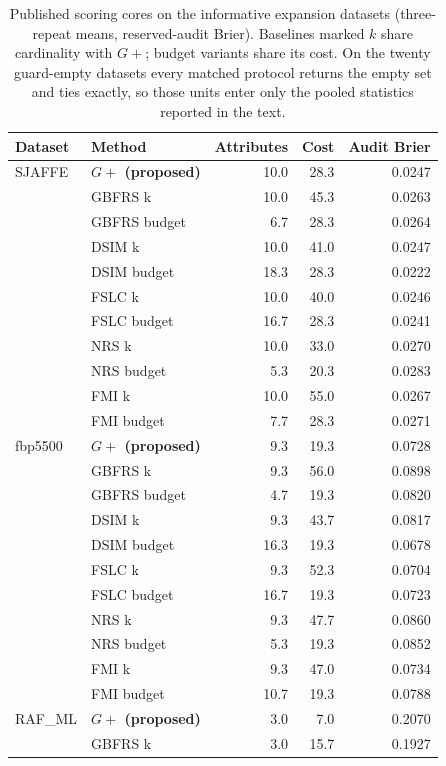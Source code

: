 \begin{table}[htbp]
\centering\small\renewcommand{\arraystretch}{1.25}\setlength{\tabcolsep}{4pt}
\caption{Published scoring cores on the informative expansion datasets (three-repeat means, reserved-audit Brier). Baselines marked $k$ share cardinality with $G+$; budget variants share its cost. On the twenty guard-empty datasets every matched protocol returns the empty set and ties exactly, so those units enter only the pooled statistics reported in the text.}
\label{tab:expansion-published}
\begin{tabular}{llrrr}\hline
Dataset & Method & Attributes & Cost & Audit Brier\\\hline
SJAFFE & \textbf{$G+$ (proposed)} & 10.0 & 28.3 & 0.0247\\
 & GBFRS k & 10.0 & 45.3 & 0.0263\\
 & GBFRS budget & 6.7 & 28.3 & 0.0264\\
 & DSIM k & 10.0 & 41.0 & 0.0247\\
 & DSIM budget & 18.3 & 28.3 & 0.0222\\
 & FSLC k & 10.0 & 40.0 & 0.0246\\
 & FSLC budget & 16.7 & 28.3 & 0.0241\\
 & NRS k & 10.0 & 33.0 & 0.0270\\
 & NRS budget & 5.3 & 20.3 & 0.0283\\
 & FMI k & 10.0 & 55.0 & 0.0267\\
 & FMI budget & 7.7 & 28.3 & 0.0271\\
\hline
fbp5500 & \textbf{$G+$ (proposed)} & 9.3 & 19.3 & 0.0728\\
 & GBFRS k & 9.3 & 56.0 & 0.0898\\
 & GBFRS budget & 4.7 & 19.3 & 0.0820\\
 & DSIM k & 9.3 & 43.7 & 0.0817\\
 & DSIM budget & 16.3 & 19.3 & 0.0678\\
 & FSLC k & 9.3 & 52.3 & 0.0704\\
 & FSLC budget & 16.7 & 19.3 & 0.0723\\
 & NRS k & 9.3 & 47.7 & 0.0860\\
 & NRS budget & 5.3 & 19.3 & 0.0852\\
 & FMI k & 9.3 & 47.0 & 0.0734\\
 & FMI budget & 10.7 & 19.3 & 0.0788\\
\hline
RAF\_ML & \textbf{$G+$ (proposed)} & 3.0 & 7.0 & 0.2070\\
 & GBFRS k & 3.0 & 15.7 & 0.1927\\

\end{tabular}
\end{table}
